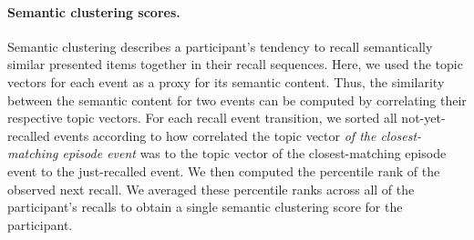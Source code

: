 \documentclass[10pt]{article}
\begin{document}
\paragraph{Semantic clustering scores.} Semantic clustering describes a participant's tendency to recall semantically similar presented items together in their recall sequences.  Here, we used the topic vectors for each event as a proxy for its semantic content. Thus, the similarity between the semantic content for two events can be computed by correlating their respective topic vectors.  For each recall event transition, we sorted all not-yet-recalled events according to how correlated the topic vector \textit{of the closest-matching episode event} was to the topic vector of the closest-matching episode event to the just-recalled event.  We then computed the percentile rank of the observed next recall.  We averaged these percentile ranks across all of the participant's recalls to obtain a single semantic clustering score for the participant.

\end{document}
